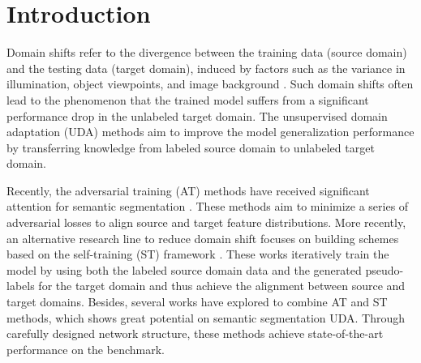 \documentclass[runningheads]{llncs}
\begin{document}
\section{Introduction}
Domain shifts refer to the divergence between the training data (source domain) and the testing data (target domain), induced by factors such as the variance in illumination, object viewpoints, and image background \cite{tsai2018learning,chen2018domain}. Such domain shifts often lead to the phenomenon that the trained model suffers from a significant performance drop in the unlabeled target domain. The unsupervised domain adaptation (UDA) methods aim to improve the model generalization performance by transferring knowledge from labeled source domain to unlabeled target domain.

Recently, the adversarial training (AT) methods have received significant attention for semantic segmentation \cite{tsai2018learning,hoffman2018cycada,huang2018multimodal,long2018conditional,du2019ssf,vu2019advent}. These methods aim to minimize a series of adversarial losses to align source and target feature distributions. More recently, an alternative research line to reduce domain shift focuses on building schemes based on the self-training (ST) framework \cite{zou2018unsupervised,chen2019progressive,zheng2019unsupervised,zou2019confidence,lian2019constructing,zhang2019category}. These works iteratively train the model by using both the labeled source domain data and the generated pseudo-labels for the target domain and thus achieve the alignment between source and target domains. Besides, several works \cite{li2019bidirectional,tsai2019domain,zheng2019unsupervised} have explored to combine AT and ST methods, which shows great potential on semantic segmentation UDA. Through carefully designed network structure, these methods achieve state-of-the-art performance on the benchmark.


\begin{table}[ht]
\caption{Performance comparison of AT and ST. \emph{AT}: adversarial training based methods; \emph{ST}: self-training based methods; \emph{AT + ST}: the mixed methods}

\label{table:intro}
\end{table}
\end{document}
